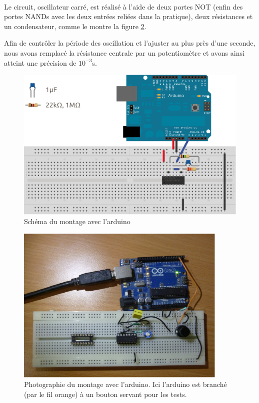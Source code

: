 \documentclass{article}
\begin{document}
\paragraph{}Le circuit, oscillateur carré, est réalisé à l'aide de deux portes NOT (enfin des portes NANDs avec les deux entrées reliées dans la pratique), deux résistances et un condensateur, comme le montre la figure \ref{schema}.

Afin de contrôler la période des oscillation et l'ajuster au plus près d'une seconde, nous avons remplacé la résistance centrale par un potentiomètre et avons ainsi atteint une précision de $10^{-3}$s.


\begin{figure}[h]
\centering
\includegraphics{sysdig_clock.eps}
\caption{\label{arduino_schema} Schéma du montage avec l'arduino}
\end{figure}

\begin{figure}[h]
\centering
\includegraphics[width=0.9\textwidth,height=0.9\textheight,keepaspectratio]{arduino.jpg.eps}
\caption{\label{schema} Photographie du montage avec l'arduino. Ici l'arduino est branché (par le fil orange) à un bouton servant pour les tests.}
\end{figure}
\end{document}
